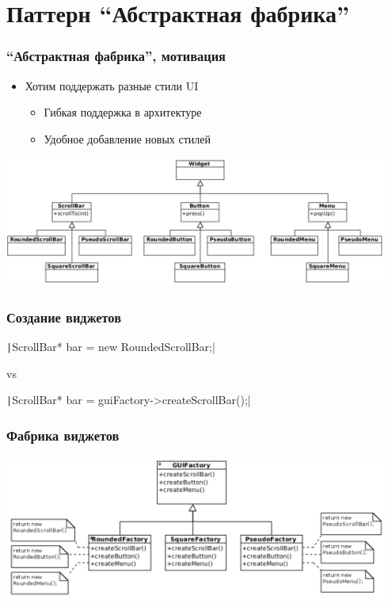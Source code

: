 \documentclass{../../slides-style}
\begin{document}
    \begin{frame}[plain]
        \titlepage
    \end{frame}

    \section{Паттерн ``Абстрактная фабрика''}

    \begin{frame}
        \frametitle{``Абстрактная фабрика'', мотивация}
        \begin{itemize}
            \item Хотим поддержать разные стили UI
            \begin{itemize}
                \item Гибкая поддержка в архитектуре
                \item Удобное добавление новых стилей
            \end{itemize}
        \end{itemize}
        \begin{center}
            \includegraphics[width=0.95\textwidth]{widgets.png}
        \end{center}
    \end{frame}

    \begin{frame}
        \frametitle{Создание виджетов}
        \texttt|ScrollBar* bar = new RoundedScrollBar;|
        
        \vspace{2mm}
        
        vs
        
        \vspace{2mm}
        
        \texttt|ScrollBar* bar = guiFactory->createScrollBar();|
    \end{frame}

    \begin{frame}
        \frametitle{Фабрика виджетов}
        \begin{center}
            \includegraphics[width=0.95\textwidth]{widgetFactory.png}
        \end{center}
    \end{frame}
\end{document}
